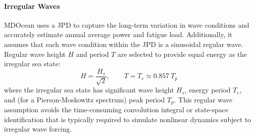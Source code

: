 

\paragraph{Irregular Waves}
MDOcean uses a JPD to capture the long-term variation in wave conditions and accurately estimate annual average power and fatigue load.
Additionally, it assumes that each wave condition within the JPD is a sinusoidal regular wave.
Regular wave height $H$ and period $T$ are selected to provide equal energy as the irregular sea state:
\begin{equation}
    H = \frac{H_s}{\sqrt{2}}, \qquad T = T_e \approx 0.857 ~T_p 
\end{equation}
where the irregular sea state has significant wave height $H_s$, energy period $T_e$, and (for a Pierson-Moskowitz spectrum) peak period $T_p$.
This regular wave assumption avoids the time-consuming convolution integral or state-space identification that is typically required to simulate nonlinear dynamics subject to irregular wave forcing.

